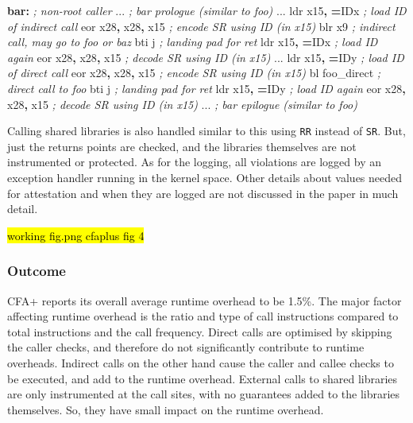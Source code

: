 \documentclass[a4paper, nobind]{templates/ociamthesis}
\newenvironment{Shaded}{\begin{snugshade}}{\end{snugshade}}
\newcommand{\CommentTok}[1]{\textcolor[rgb]{0.56,0.35,0.01}{\textit{#1}}}
\newcommand{\FunctionTok}[1]{\textcolor[rgb]{0.13,0.29,0.53}{\textbf{#1}}}
\newcommand{\NormalTok}[1]{#1}
\newcommand{\OperatorTok}[1]{\textcolor[rgb]{0.81,0.36,0.00}{\textbf{#1}}}
\renewenvironment{Shaded}
{
  \vspace{10pt}%
  \begin{snugshade}%
}{%
  \end{snugshade}%
  \vspace{8pt}%
}
\begin{document}
\begin{Shaded}
\begin{Highlighting}[]
\FunctionTok{bar:}                    \CommentTok{; non{-}root caller}
\NormalTok{  ...                   }\CommentTok{; bar prologue (similar to foo)}
\NormalTok{  ...}
\NormalTok{  ldr x15}\OperatorTok{,} \OperatorTok{=}\NormalTok{IDx         }\CommentTok{; load ID of indirect call}
\NormalTok{  eor x28}\OperatorTok{,}\NormalTok{ x28}\OperatorTok{,}\NormalTok{ x15     }\CommentTok{; encode SR using ID (in x15)}
\NormalTok{  blr x9                }\CommentTok{; indirect call, may go to foo or baz}
\NormalTok{  bti j                 }\CommentTok{; landing pad for ret}
\NormalTok{  ldr x15}\OperatorTok{,} \OperatorTok{=}\NormalTok{IDx         }\CommentTok{; load ID again}
\NormalTok{  eor x28}\OperatorTok{,}\NormalTok{ x28}\OperatorTok{,}\NormalTok{ x15     }\CommentTok{; decode SR using ID (in x15)}
\NormalTok{  ...}
\NormalTok{  ldr x15}\OperatorTok{,} \OperatorTok{=}\NormalTok{IDy         }\CommentTok{; load ID of direct call}
\NormalTok{  eor x28}\OperatorTok{,}\NormalTok{ x28}\OperatorTok{,}\NormalTok{ x15     }\CommentTok{; encode SR using ID (in x15)}
\NormalTok{  bl foo\_direct         }\CommentTok{; direct call to foo}
\NormalTok{  bti j                 }\CommentTok{; landing pad for ret}
\NormalTok{  ldr x15}\OperatorTok{,} \OperatorTok{=}\NormalTok{IDy         }\CommentTok{; load ID again}
\NormalTok{  eor x28}\OperatorTok{,}\NormalTok{ x28}\OperatorTok{,}\NormalTok{ x15     }\CommentTok{; decode SR using ID (in x15)}
\NormalTok{  ...                   }\CommentTok{; bar epilogue (similar to foo)}
\end{Highlighting}
\end{Shaded}

Calling shared libraries is also handled similar to this using \texttt{RR} instead of \texttt{SR}.
But, just the returns points are checked, and the libraries themselves are not
instrumented or protected. As for the logging, all violations are logged by an
exception handler running in the kernel space. Other details about values needed for
attestation and when they are logged are not discussed in the paper in much detail.

\hl{working fig.png cfaplus fig 4}

\subsubsection{Outcome}\label{outcome}

CFA+ reports its overall average runtime overhead to be 1.5\%.
The major factor affecting runtime overhead is the ratio and type of call instructions
compared to total instructions and the call frequency.
Direct calls are optimised by skipping the caller checks, and therefore do not
significantly contribute to runtime overheads. Indirect calls on the other hand
cause the caller and callee checks to be executed, and add to the runtime overhead.
External calls to shared libraries are only instrumented at the call sites, with
no guarantees added to the libraries themselves. So, they have small impact on
the runtime overhead.
\end{document}
